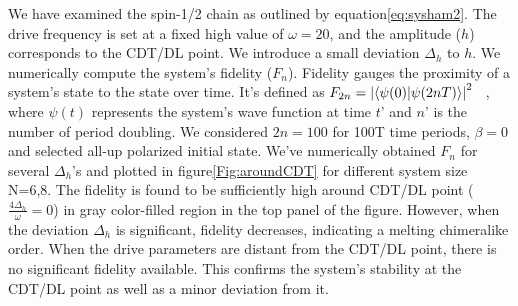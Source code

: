 \documentclass[12pt]{iopart}
\begin{document}
We have examined the spin-1/2 chain as outlined by equation\ref{eq:sysham2}. The drive frequency is set at a fixed high value of $\omega=20$, and the amplitude ($h$) corresponds to the CDT/DL point. We introduce a small deviation $\Delta_h$ to $h$. We numerically compute the system's fidelity ($F_n$). Fidelity gauges the proximity of a system's state to the state over time. It's defined as $F_{2n} = \abs{\braket{\psi(0)}{\psi (2nT)}}^2$ ~\cite{Jozsa1994,Liu2023}, where $\psi(t)$ represents the system's wave function at time $t$' and $n$' is the number of period doubling. We considered $2n=100$ for 100T time periods, $\beta=0$ and selected all-up polarized initial state. We've numerically obtained $F_n$ for several $\Delta_h$'s and plotted in figure\ref{Fig:aroundCDT} for different system size N=6,8. The fidelity is found to be sufficiently high around CDT/DL point ($\frac{4\Delta_h}{\omega} = 0$) in gray color-filled region in the top panel of the figure. However, when the deviation $\Delta_h$ is significant, fidelity decreases, indicating a melting chimeralike order. When the drive parameters are distant from the CDT/DL point, there is no significant fidelity available. This confirms the system's stability at the CDT/DL point as well as a minor deviation from it.



\end{document}
